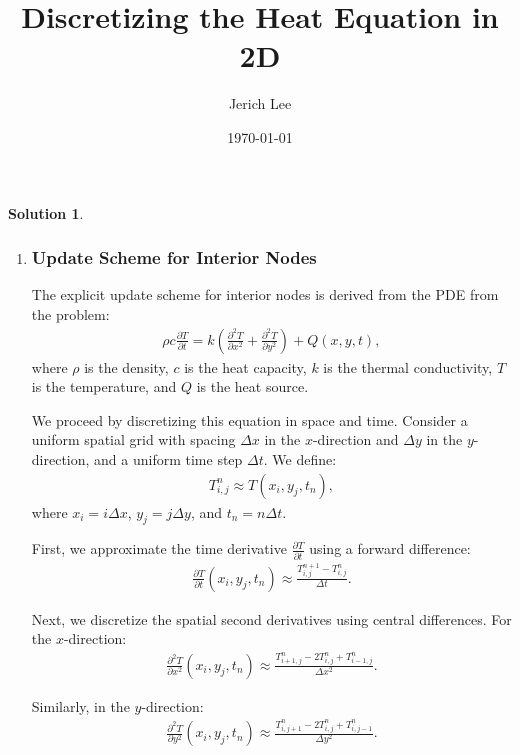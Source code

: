 \documentclass[12pt]{article}
\title{Discretizing the Heat Equation in 2D}
\author{Jerich Lee}
\date{\today}
\theoremstyle{definition} %
\newtheorem{solution}{Solution}
\theoremstyle{plain} %
\begin{document}
\maketitle


\begin{solution}
\noindent
    \begin{enumerate}
        \item \subsubsection*{Update Scheme for Interior Nodes}

        The explicit update scheme for interior nodes is derived from the PDE from the problem:
        \begin{align}
        \rho c \frac{\partial T}{\partial t} = k \left( \frac{\partial^2 T}{\partial x^2} + \frac{\partial^2 T}{\partial y^2} \right) + Q(x, y, t),
        \end{align}
        where $\rho$ is the density, $c$ is the heat capacity, $k$ is the thermal conductivity, $T$ is the temperature, and $Q$ is the heat source.
        
        \noindent We proceed by discretizing this equation in space and time. Consider a uniform spatial grid with spacing $\Delta x$ in the $x$-direction and $\Delta y$ in the $y$-direction, and a uniform time step $\Delta t$. We define:
        \begin{align}
        T_{i,j}^n \approx T(x_i, y_j, t_n),
        \end{align}
        where $x_i = i \Delta x$, $y_j = j \Delta y$, and $t_n = n \Delta t$.
        
        \noindent First, we approximate the time derivative $\frac{\partial T}{\partial t}$ using a forward difference:
        \begin{align}
        \frac{\partial T}{\partial t}(x_i, y_j, t_n) \approx \frac{T_{i,j}^{n+1} - T_{i,j}^n}{\Delta t}.
        \end{align}
        
        \noindent Next, we discretize the spatial second derivatives using central differences. For the $x$-direction:
        \begin{align}
        \frac{\partial^2 T}{\partial x^2}(x_i, y_j, t_n) \approx \frac{T_{i+1,j}^n - 2T_{i,j}^n + T_{i-1,j}^n}{\Delta x^2}.
        \end{align}
        
        \noindent Similarly, in the $y$-direction:
        \begin{align}
        \frac{\partial^2 T}{\partial y^2}(x_i, y_j, t_n) \approx \frac{T_{i,j+1}^n - 2T_{i,j}^n + T_{i,j-1}^n}{\Delta y^2}.
        \end{align}
        

\end{enumerate}
\end{solution}
\end{document}
